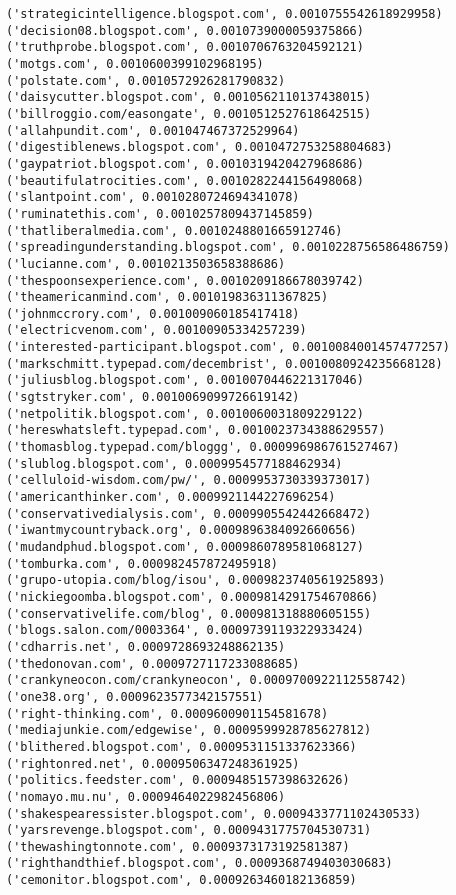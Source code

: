 \documentclass[11pt]{article}
\begin{document}
\begin{Verbatim}[commandchars=\\\{\}]
('strategicintelligence.blogspot.com', 0.0010755542618929958)
('decision08.blogspot.com', 0.0010739000059375866)
('truthprobe.blogspot.com', 0.0010706763204592121)
('motgs.com', 0.0010600399102968195)
('polstate.com', 0.0010572926281790832)
('daisycutter.blogspot.com', 0.0010562110137438015)
('billroggio.com/easongate', 0.0010512527618642515)
('allahpundit.com', 0.001047467372529964)
('digestiblenews.blogspot.com', 0.0010472753258804683)
('gaypatriot.blogspot.com', 0.0010319420427968686)
('beautifulatrocities.com', 0.0010282244156498068)
('slantpoint.com', 0.0010280724694341078)
('ruminatethis.com', 0.0010257809437145859)
('thatliberalmedia.com', 0.0010248801665912746)
('spreadingunderstanding.blogspot.com', 0.0010228756586486759)
('lucianne.com', 0.0010213503658388686)
('thespoonsexperience.com', 0.0010209186678039742)
('theamericanmind.com', 0.001019836311367825)
('johnmccrory.com', 0.001009060185417418)
('electricvenom.com', 0.00100905334257239)
('interested-participant.blogspot.com', 0.0010084001457477257)
('markschmitt.typepad.com/decembrist', 0.0010080924235668128)
('juliusblog.blogspot.com', 0.0010070446221317046)
('sgtstryker.com', 0.0010069099726619142)
('netpolitik.blogspot.com', 0.0010060031809229122)
('hereswhatsleft.typepad.com', 0.0010023734388629557)
('thomasblog.typepad.com/bloggg', 0.000996986761527467)
('slublog.blogspot.com', 0.0009954577188462934)
('celluloid-wisdom.com/pw/', 0.0009953730339373017)
('americanthinker.com', 0.0009921144227696254)
('conservativedialysis.com', 0.0009905542442668472)
('iwantmycountryback.org', 0.0009896384092660656)
('mudandphud.blogspot.com', 0.0009860789581068127)
('tomburka.com', 0.000982457872495918)
('grupo-utopia.com/blog/isou', 0.0009823740561925893)
('nickiegoomba.blogspot.com', 0.0009814291754670866)
('conservativelife.com/blog', 0.000981318880605155)
('blogs.salon.com/0003364', 0.0009739119322933424)
('cdharris.net', 0.0009728693248862135)
('thedonovan.com', 0.0009727117233088685)
('crankyneocon.com/crankyneocon', 0.0009700922112558742)
('one38.org', 0.0009623577342157551)
('right-thinking.com', 0.0009600901154581678)
('mediajunkie.com/edgewise', 0.0009599928785627812)
('blithered.blogspot.com', 0.0009531151337623366)
('rightonred.net', 0.0009506347248361925)
('politics.feedster.com', 0.0009485157398632626)
('nomayo.mu.nu', 0.0009464022982456806)
('shakespearessister.blogspot.com', 0.0009433771102430533)
('yarsrevenge.blogspot.com', 0.0009431775704530731)
('thewashingtonnote.com', 0.0009373173192581387)
('righthandthief.blogspot.com', 0.0009368749403030683)
('cemonitor.blogspot.com', 0.0009263460182136859)

\end{Verbatim}
\end{document}
